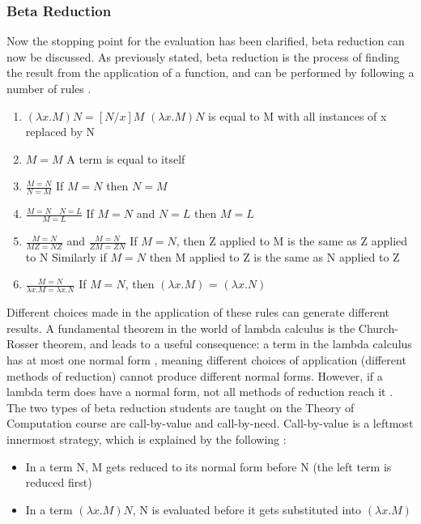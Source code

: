 \documentclass[a4paper,12pt]{report}
\begin{document}
\subsubsection{Beta Reduction}

Now the stopping point for the evaluation has been clarified, beta reduction can now be discussed. As previously stated, beta reduction is the process of finding the result from the application of a function, and can be performed by following a number of rules \cite{Gay2019}.

\begin{enumerate}
	\item $(\lambda x.M)N = [N / x]M$
	\subitem $(\lambda x.M)N$ is equal to M with all instances of x replaced by N
	\item $M = M$
	\subitem A term is equal to itself
	\item $\frac{M=N}{N=M}$
	\subitem If $M=N$ then $N=M$
	\item $\frac{M=N \quad N=L}{M=L}$
	\subitem If $M=N$ and $N=L$ then $M=L$
	\item $\frac{M=N}{MZ=NZ}$ and $\frac{M=N}{ZM=ZN}$
	\subitem If $M=N$, then Z applied to M is the same as Z applied to N
	\subitem Similarly if $M=N$ then M applied to Z is the same as N applied to Z
	\item $\frac{M=N}{\lambda x.M = \lambda x.N}$
	\subitem If $M=N$, then $(\lambda x.M)$ = $(\lambda x.N)$
\end{enumerate}

Different choices made in the application of these rules can generate different results. A fundamental theorem in the world of lambda calculus is the Church-Rosser theorem, and leads to a useful consequence: a term in the lambda calculus has at most one normal form \cite{Alonzo1936}, meaning different choices of application (different methods of reduction) cannot produce different normal forms. However, if a lambda term does have a normal form, not all methods of reduction reach it \cite{Horowitz2013}.\\

The two types of beta reduction students are taught on the Theory of Computation course are call-by-value and call-by-need. Call-by-value is a leftmost innermost strategy, which is explained by the following \cite{Gay2019}:

\begin{itemize}
	\item In a term N, M gets reduced to its normal form before N (the left term is reduced first)
	\item In a term $(\lambda x.M)N$, N is evaluated before it gets substituted into $(\lambda x.M)$
\end{itemize}
\end{document}
